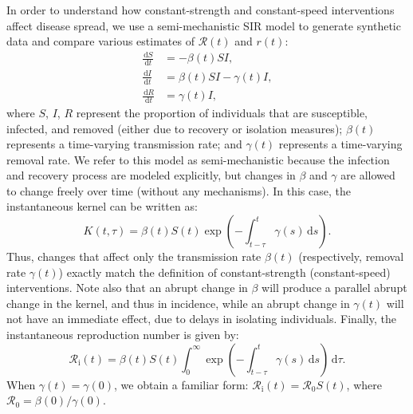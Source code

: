 \documentclass[12pt]{article}
\newcommand{\comment}{}
\renewcommand{\comment}{\showcomment}
\renewcommand{\comment}{\nocomment}
\newcommand{\showcomment}[3]{\textcolor{#1}{\textbf{[#2: }\textsl{#3}\textbf{]}}}
\newcommand{\nocomment}[3]{}
\newcommand{\jd}[1]{\comment{cyan}{JD}{#1}}
\newcommand{\swp}[1]{\comment{magenta}{SWP}{#1}}
\newcommand{\Rx}[1]{\ensuremath{{\mathcal R}_{#1}}\xspace}
\newcommand{\Ro}{\Rx{0}}
\newcommand{\Ri}{\Rx{\mathrm{i}}}
\newcommand{\RR}{\ensuremath{{\mathcal R}}\xspace}
\newcommand{\dd}[1]{\ensuremath{\, \mathrm{d}#1}}
\newcommand{\dtau}{\dd{\tau}}
\begin{document}
In order to understand how constant-strength and constant-speed interventions affect disease spread, we use a semi-mechanistic SIR model to generate synthetic data and compare various estimates of $\RR(t)$ and $r(t)$:
\begin{align}
\frac{\dd{S}}{\dd{t}} &= - \beta(t)S I, \label{eq:dSdt}\\
\frac{\dd{I}}{\dd{t}} &= \beta(t)S I - \gamma(t) I,\\
\frac{\dd{R}}{\dd{t}} &= \gamma(t) I,  \label{eq:dRdt}
\end{align}
where $S$, $I$, $R$ represent the proportion of individuals that are susceptible, infected, and removed (either due to recovery or isolation measures);
$\beta(t)$ represents a time-varying transmission rate; and $\gamma(t)$ represents a time-varying removal rate.
We refer to this model as semi-mechanistic because the infection and recovery process are modeled explicitly, but changes in $\beta$ and $\gamma$ are allowed to change freely over time (without any mechanisms).
In this case, the instantaneous kernel can be written as:
\begin{equation}
K(t, \tau) = \beta(t) S(t) \exp\left(-\int_{t-\tau}^t \gamma(s) \dd{s} \right).
\end{equation}
Thus, changes that affect only the transmission rate $\beta(t)$ (respectively, removal rate $\gamma(t)$) exactly match the definition of constant-strength (constant-speed) interventions.
Note also that an abrupt change in $\beta$ will produce a parallel abrupt change in the kernel, and thus in incidence, while an abrupt change in $\gamma(t)$ will not have an immediate effect, due to delays in isolating individuals.
Finally, the instantaneous reproduction number is given by:
\begin{equation}
\Ri(t) = \beta(t) S(t) \int_0^\infty \exp\left(-\int_{t-\tau}^t \gamma(s) \dd{s} \right) \dtau.
\end{equation}
When $\gamma(t) = \gamma(0)$, we obtain a familiar form: $\Ri(t) = \Ro S(t)$,
where $\Ro = \beta(0)/\gamma(0)$.

\jd{There's a weird subtlety here that we should discuss. It is not obvious how to define the instantaneous kernel, right? It seems possible to argue either for or against the idea that the instantaneous reproduction number is always $\beta(t)/\gamma(t)$ in the SIR. I guess it comes down to whether Fraser's “conditions” refer to $\gamma$ or to $f$ in this case?}
\swp{Pretty sure we've talked about this before. Defining intantaneous kernel also seems obvious to me... in particular, this instantaneous kernel is going to properly link the renewal equation and also give the correct forward kernel. $\beta(t)/\gamma(t)$ is sensitive to sudden changes in $\gamm$ which is not what's happening to transmission.}
\end{document}
